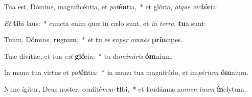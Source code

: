 \item Tua est, Dómine, magnificéntia, et \textit{pot}\textbf{én}tia,~* et glória, \textit{at}\textit{que} \textit{vic}\textbf{tó}ria:
\item \textit{Et} \textbf{ti}bi laus:~* cuncta enim quæ in cælo sunt, et \textit{in} \textit{ter}\textit{ra}, \textbf{tu}a sunt:
\item Tuum, Dómi\textit{ne}, \textbf{re}gnum,~* et tu es su\textit{per} \textit{om}\textit{nes} \textbf{prín}cipes.
\item Tuæ divítiæ, et tua \textit{est} \textbf{gló}ria:~* tu do\textit{mi}\textit{ná}\textit{ris} \textbf{óm}nium,
\item In manu tua virtus et \textit{pot}\textbf{én}tia:~* in manu tua magnitúdo, et im\textit{pé}\textit{ri}\textit{um} \textbf{óm}nium.
\item Nunc ígitur, Deus noster, confité\textit{mur} \textbf{ti}bi,~* et laudámus no\textit{men} \textit{tu}\textit{um} \textbf{ín}clytum.
